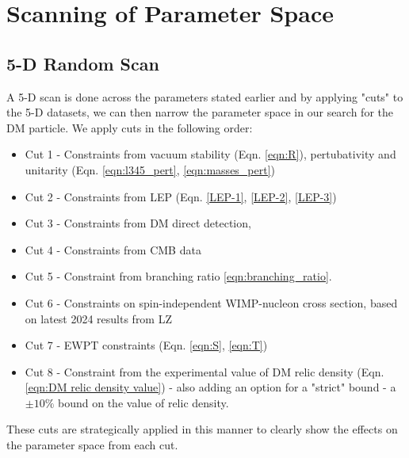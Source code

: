 \documentclass[12pt]{article}
\begin{document}
\section{Scanning of Parameter Space}
\label{sec:results}
\subsection{5-D Random Scan}
\label{5-D scan}
A 5-D scan is done across the parameters stated earlier and by applying "cuts" to the 5-D datasets, we can then narrow the parameter space in our search for the DM particle.
We apply cuts in the following order:
\begin{itemize}
    \item Cut 1 - Constraints from vacuum stability (Eqn. \ref{eqn:R}), pertubativity and unitarity (Eqn. \ref{eqn:l345_pert}, \ref{eqn:masses_pert}) 
    \item Cut 2 - Constraints from LEP (Eqn. \ref{LEP-1}, \ref{LEP-2}, \ref{LEP-3}) 
    \item Cut 3 - Constraints from DM direct detection, 
    \item Cut 4 - Constraints from CMB data
    \item Cut 5 - Constraint from branching ratio \ref{eqn:branching_ratio}.
    \item Cut 6 - Constraints on spin-independent WIMP-nucleon cross section, based on latest 2024 results from LZ \cite{aalbers2024darkmattersearchresults}
    \item Cut 7 - EWPT constraints (Eqn. \ref{eqn:S}, \ref{eqn:T})
    \item Cut 8 - Constraint from the experimental value of DM relic density (Eqn. \ref{eqn:DM relic density value}) - also adding an option for a "strict" bound - a $\pm 10 \%$ bound on the value of relic density.
\end{itemize}
These cuts are strategically applied in this manner to clearly show the effects on the parameter space from each cut.
\end{document}
